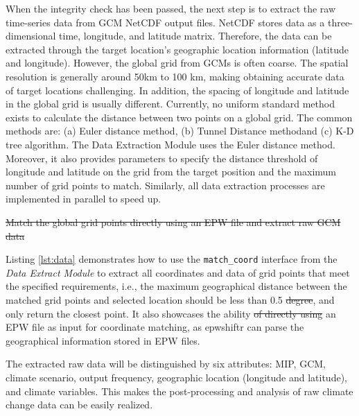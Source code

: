 \documentclass[twocolumn, a4paper,10pt]{article}
\providecommand{\DIFaddtex}[1]{{\protect\color{blue}\uwave{#1}}} %
\providecommand{\DIFdeltex}[1]{{\protect\color{red}\sout{#1}}}                      %
\providecommand{\DIFaddbegin}{} %
\providecommand{\DIFaddend}{} %
\providecommand{\DIFdelbegin}{} %
\providecommand{\DIFdelend}{} %
\providecommand{\DIFadd}[1]{\texorpdfstring{\DIFaddtex{#1}}{#1}} %
\providecommand{\DIFdel}[1]{\texorpdfstring{\DIFdeltex{#1}}{}} %
\newcommand{\DIFscaledelfig}{0.5}
\newlength{\DIFdelgraphicswidth} %
\newlength{\DIFdelgraphicsheight} %
\newcommand{\DIFaddincludegraphics}[2][]{{\color{blue}\fbox{\DIFOincludegraphics[#1]{#2}}}} %
\newcommand{\DIFdelincludegraphics}[2][]{%
\sbox{\DIFdelgraphicsbox}{\DIFOincludegraphics[#1]{#2}}%
\settoboxwidth{\DIFdelgraphicswidth}{\DIFdelgraphicsbox} %
\settoboxtotalheight{\DIFdelgraphicsheight}{\DIFdelgraphicsbox} %
\scalebox{\DIFscaledelfig}{%
\parbox[b]{\DIFdelgraphicswidth}{\usebox{\DIFdelgraphicsbox}\\[-\baselineskip] \rule{\DIFdelgraphicswidth}{0em}}\llap{\resizebox{\DIFdelgraphicswidth}{\DIFdelgraphicsheight}{%
\setlength{\unitlength}{\DIFdelgraphicswidth}%
\begin{picture}(1,1)%
\thicklines\linethickness{2pt} %
{\color[rgb]{1,0,0}\put(0,0){\framebox(1,1){}}}%
{\color[rgb]{1,0,0}\put(0,0){\line( 1,1){1}}}%
{\color[rgb]{1,0,0}\put(0,1){\line(1,-1){1}}}%
\end{picture}%
}\hspace*{3pt}}} %
} %
\DeclareRobustCommand{\DIFaddbegin}{\DIFOaddbegin \let\includegraphics\DIFaddincludegraphics} %
\DeclareRobustCommand{\DIFaddend}{\DIFOaddend \let\includegraphics\DIFOincludegraphics} %
\DeclareRobustCommand{\DIFdelbegin}{\DIFOdelbegin \let\includegraphics\DIFdelincludegraphics} %
\DeclareRobustCommand{\DIFdelend}{\DIFOaddend \let\includegraphics\DIFOincludegraphics} %
\begin{document}
When the integrity check has been passed, the next step is to extract the raw
time-series data from GCM NetCDF output files. NetCDF stores data as a
three-dimensional time, longitude, and latitude matrix. Therefore, the data can
be extracted through the target location's geographic location information
(latitude and longitude). However, the global grid from GCMs is often coarse.
The spatial resolution is generally around 50km to 100 km, making obtaining
accurate data of target locations challenging. In addition, the spacing of
longitude and latitude in the global grid is usually different. Currently, no
uniform standard method exists to calculate the distance between two points on a
global grid. The common methods are: (a) \DIFaddbegin \DIFadd{the }\DIFaddend Euler distance method, (b) \DIFaddbegin \DIFadd{the }\DIFaddend Tunnel
Distance method\DIFaddbegin \DIFadd{, }\DIFaddend and (c) \DIFaddbegin \DIFadd{the }\DIFaddend K-D tree algorithm. The Data Extraction Module uses the
Euler distance method. Moreover, it also provides parameters to specify the
distance threshold of longitude and latitude on the grid from the target
position and the maximum number of grid points to match. Similarly, all data
extraction processes are implemented in parallel to speed up.

\DIFdelbegin %
{%
\DIFdel{Match the global grid points directly using an EPW file and extract raw GCM data}}%

\DIFdelend Listing \ref{lst:data} demonstrates how to use the \texttt{match\_coord} interface from
the \emph{Data Extract Module} to extract all coordinates and data of grid points that
meet the specified requirements, i.e., the maximum geographical distance between
the matched grid points and selected location should be less than 0.5 \DIFdelbegin \DIFdel{degree}\DIFdelend \DIFaddbegin \DIFadd{degrees}\DIFaddend ,
and only return the closest point. It also showcases the ability \DIFdelbegin \DIFdel{of directly
using }\DIFdelend \DIFaddbegin \DIFadd{to directly
use }\DIFaddend an EPW file as input for coordinate matching, as epwshiftr can parse the
geographical information stored in EPW files.

The extracted raw data will be distinguished by six attributes: MIP, GCM,
climate scenario, output frequency, geographic location (longitude and latitude),
and climate variables. This makes the post-processing and analysis of raw
climate change data can be easily realized.
\end{document}

